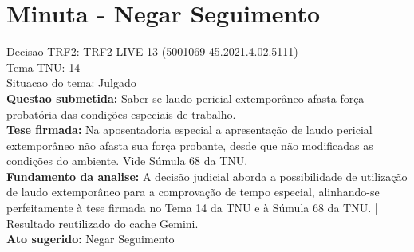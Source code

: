 \documentclass{article}
\begin{document}
\section*{Minuta - Negar Seguimento}
Decisao TRF2: TRF2-LIVE-13 (5001069-45.2021.4.02.5111)\\
Tema TNU: 14\\
Situacao do tema: Julgado\\
\textbf{Questao submetida:} Saber se laudo pericial extemporâneo afasta força probatória das condições especiais de trabalho.\\
\textbf{Tese firmada:} Na aposentadoria especial a apresentação de laudo pericial extemporâneo não afasta sua força probante, desde que não modificadas as condições do ambiente. Vide Súmula 68 da TNU.\\
\textbf{Fundamento da analise:} A decisão judicial aborda a possibilidade de utilização de laudo extemporâneo para a comprovação de tempo especial, alinhando-se perfeitamente à tese firmada no Tema 14 da TNU e à Súmula 68 da TNU. | Resultado reutilizado do cache Gemini.\\
\textbf{Ato sugerido:} Negar Seguimento
\end{document}
